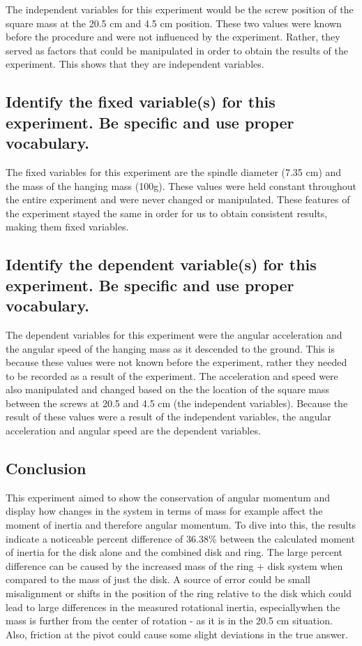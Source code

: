 \documentclass[12pt]{article}
\begin{document}
The independent variables for this experiment would be the screw position of the square mass at the 20.5 cm and 4.5 cm position. These two values were known before the procedure and were not influenced by the experiment. Rather, they served as factors that could be manipulated in order to obtain the results of the experiment. This shows that they are independent variables.

\subsection{Identify the fixed variable(s) for this experiment.
Be specific and use proper vocabulary.}

The fixed variables for this experiment are the spindle diameter (7.35 cm)  and the mass of the hanging mass (100g). These values were held constant throughout the entire experiment and were never changed or manipulated. These features of the experiment stayed the same in order for us to obtain consistent results, making them fixed variables.

\subsection{Identify the dependent variable(s) for this experiment.
Be specific and use proper vocabulary.}

The dependent variables for this experiment were the angular acceleration and the angular speed of the hanging mass as it descended to the ground. This is because these values were not known before the experiment, rather they needed to be recorded as a result of the experiment. The acceleration and speed were also manipulated and changed based on the the location of the square mass between the screws at 20.5 and 4.5 cm (the independent variables).  Because the result of these values were a result of the independent variables, the angular acceleration and angular speed are the dependent variables.

\subsection{Conclusion}
This experiment aimed to show the conservation of angular momentum and display how changes in the system in terms of mass for example affect the moment of inertia and therefore angular momentum. To dive into this, the results indicate a noticeable percent difference of 36.38\% between the calculated moment of inertia for the disk alone and the combined disk and ring. The large percent difference can be caused by the increased mass of the ring + disk system when compared to the mass of just the disk. A source of error could be small misalignment or shifts in the position of the ring relative to the disk which could lead to large differences in the measured rotational inertia, especiallywhen the mass is further from the center of rotation - as it is in the 20.5 cm situation. Also, friction at the pivot could cause some slight deviations in the true answer.
\end{document}
